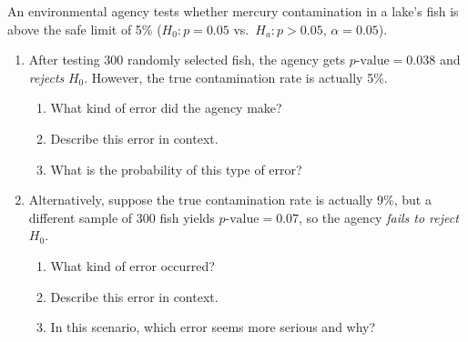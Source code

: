 \documentclass[10pt]{article}
\begin{document}
\namedateperiod

\vspace{0.15in}

An environmental agency tests whether mercury contamination in a lake's fish is above the
safe limit of 5\% ($H_0: p = 0.05$ vs.\ $H_a: p > 0.05$, $\alpha = 0.05$).

\begin{enumerate}
  \item After testing 300 randomly selected fish, the agency gets $p\text{-value} = 0.038$ and
        \emph{rejects} $H_0$. However, the true contamination rate is actually 5\%.
        \begin{enumerate}[label=\alph*.]
          \item What kind of error did the agency make? \blank{3cm}
          \item Describe this error in context. 
          \item What is the probability of this type of error? \blank{2cm}
        \end{enumerate}

  \item Alternatively, suppose the true contamination rate is actually 9\%, but a different
        sample of 300 fish yields $p\text{-value} = 0.07$, so the agency \emph{fails to reject} $H_0$.
        \begin{enumerate}[label=\alph*.]
          \item What kind of error occurred? \blank{3cm}
          \item Describe this error in context. 
          \item In this scenario, which error seems more serious and why? 
        \end{enumerate}
\end{enumerate}
\end{document}
